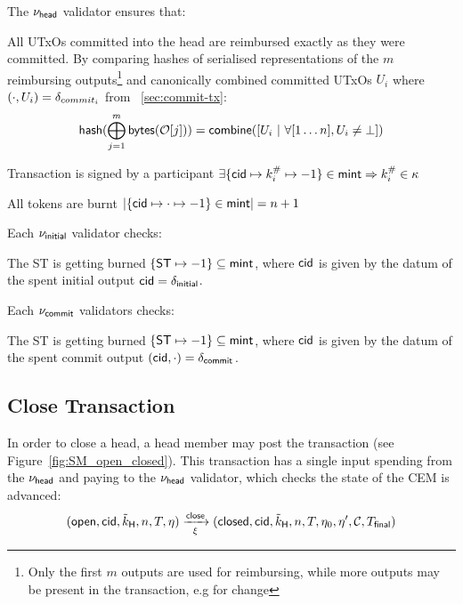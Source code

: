 \noindent The $\nu_\mathsf{head}$ validator ensures that:
\begin{menumerate}
  \item All UTxOs committed into the head are reimbursed exactly as they were
  committed. By comparing hashes of serialised representations of the $m$
  reimbursing outputs\footnote{Only the first $m$ outputs are used for
    reimbursing, while more outputs may be present in the transaction, e.g for
    change} and canonically combined committed UTxOs $U_{i}$ where $(\cdot, U_{i}) = \delta_{commit_{i}}$ from \mtxCom{}~\ref{sec:commit-tx}:
  \[
    \mathsf{hash}(\bigoplus_{j=1}^{m} \mathsf{bytes}(\mathcal{O}[j])) = \mathsf{combine}([U_{i} ~ | ~ \forall [1\dots n], U_{i} \neq \bot])
  \]

  \item Transaction is signed by a participant $\exists \{\mathsf{cid} \mapsto k^{\#}_{i} \mapsto -1\} \in \mathsf{mint} \Rightarrow k^{\#}_{i} \in \kappa$
  \item All tokens are burnt
  $|\{\mathsf{cid} \mapsto \cdot \mapsto -1\} \in \mathsf{mint}| = n + 1$
\end{menumerate}

\noindent Each $\nu_{\mathsf{initial}}$ validator checks:
\begin{menumerate}
  \item The ST is getting burned $\{\mathsf{ST} \mapsto -1\} \subseteq \mathsf{mint}$, where
  $\mathsf{cid}$ is given by the datum of the spent initial output
  $\mathsf{cid} = \delta_{\mathsf{initial}}$.
\end{menumerate}

\noindent Each $\nu_{\mathsf{commit}}$ validators checks:
\begin{menumerate}
  \item The ST is getting burned $\{\mathsf{ST} \mapsto -1\} \subseteq \mathsf{mint}$, where
  $\mathsf{cid}$ is given by the datum of the spent commit output
  $(\mathsf{cid},\cdot) = \delta_{\mathsf{commit}_{}}$.
\end{menumerate}

\subsection{Close Transaction}\label{sec:close-tx}



In order to close a head, a head member may post the \mtxClose{} transaction
(see Figure~\ref{fig:SM_open_closed}). This transaction has a single input
spending from the $\nu_\mathsf{head}$ and paying to the $\nu_\mathsf{head}$ validator, which checks
the state of the CEM is advanced:
\[
  (\mathsf{open},\mathsf{cid},\tilde{k}_{\mathsf{H}},n,T,\eta) \xrightarrow[\xi]{\mathsf{close}} (\mathsf{closed},\mathsf{cid},\tilde{k}_{\mathsf{H}},n,T,\eta_0,\eta',\mathcal{C},T_{\mathsf{final}})
\]

